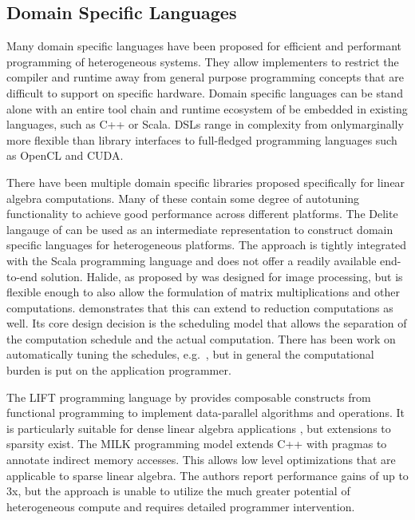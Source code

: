 \subsection{Domain Specific Languages}

    Many domain specific languages have been proposed for efficient and
    performant programming of heterogeneous systems.
    They allow implementers to restrict the compiler and runtime away from
    general purpose programming concepts that are difficult to support on
    specific hardware.
    Domain specific languages can be stand alone with an entire tool chain and
    runtime ecosystem of be embedded in existing languages, such as C++ or
    Scala.
    DSLs range in complexity from onlymarginally more flexible than library
    interfaces to full-fledged programming languages such as OpenCL and CUDA.

    There have been multiple domain specific libraries proposed specifically
    for linear algebra computations.
    Many of these contain some degree of autotuning functionality to achieve
    good performance across different platforms.
    The Delite langauge of \citet{Sujeeth:2014:DCA:2601432.2584665} can be used
    as an intermediate representation to construct domain specific languages for
    heterogeneous platforms.
    The approach is tightly integrated with the Scala programming language
    and does not offer a readily available end-to-end solution.
    Halide, as proposed by \citet{Ragan-Kelley:2013:HLC:2499370.2462176}
    was designed for image processing, but is flexible enough to also allow the 
    formulation of matrix multiplications and other computations.
    \citet{Suriana:2017:PAR:3049832.3049863} demonstrates that this can extend
    to reduction computations as well.
    Its core design decision is the scheduling model that allows the separation
    of the computation schedule and the actual computation.
    There has been work on automatically tuning the schedules, e.g.\ 
    \citet{Mullapudi:2016:ASH:2897824.2925952}, but in general the computational
    burden is put on the application programmer.

    The LIFT programming language by \citet{Steuwer:2015:GPP:2858949.2784754}
    provides composable constructs from functional programming to implement
    data-parallel algorithms and operations.
    It is particularly suitable for dense linear algebra applications
    \citep{Steuwer:2016:MMB:2968455.2968521}, but extensions to sparsity exist.
    The MILK programming model \citep{Kiriansky:2016:OIM:2967938.2967948}
    extends C++ with pragmas to annotate indirect memory accesses.
    This allows low level optimizations that are applicable to sparse linear
    algebra.
    The authors report performance gains of up to 3x, but the approach is unable
    to utilize the much greater potential of heterogeneous compute and requires
    detailed programmer intervention.


